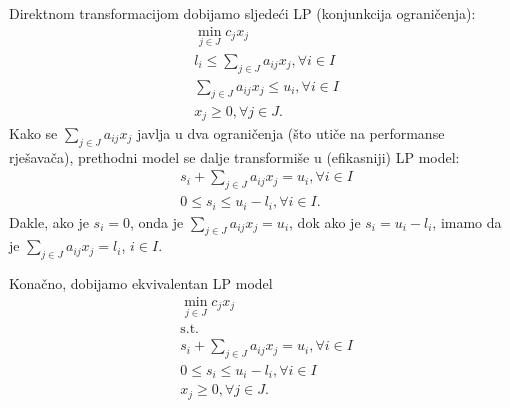 \documentclass[a4paper, utf8, 11pt, colorlinks]{book}
\begin{document}
Direktnom transformacijom dobijamo sljedeći LP (konjunkcija ograničenja): 
\begin{align*}
	& \min_{j \in J } c_j x_j \\
	&  l_i \leq \sum_{j \in J} a_{ij} x_j, \forall i\in I \\
	&  \sum_{j \in J} a_{ij} x_j \leq u_i, \forall i\in I \\
	&  x_j \geq 0, \forall j \in J.
\end{align*}
Kako    se $\sum_{j \in J} a_{ij} x_j$ javlja u dva ograničenja (što utiče na performanse rješavača), prethodni model se dalje transformiše u (efikasniji) LP model:
\begin{align*}
	&s_i + \sum_{j \in J} a_{ij} x_j = u_i, \forall i \in I \\
	& 0 \leq s_i \leq  u_i - l_i, \forall i \in I.
\end{align*}
Dakle, ako je $s_i = 0$, onda je  $\sum_{j \in J} a_{ij} x_j = u_i$, dok ako je  $s_i = u_i - l_i$, imamo da je $\sum_{j \in J} a_{ij} x_j = l_i$, $i\in I$. 

Konačno, dobijamo ekvivalentan LP model
\begin{align*}
	&\min_{j \in J } c_j x_j \\
	& \mbox{s.t.} \nonumber \\
	&s_i + \sum_{j \in J} a_{ij} x_j = u_i, \forall i \in I \\ 
	&  0 \leq s_i \leq  u_i - l_i, \forall i \in I \\
	& x_j \geq 0, \forall j \in J.
\end{align*}
\end{document}
